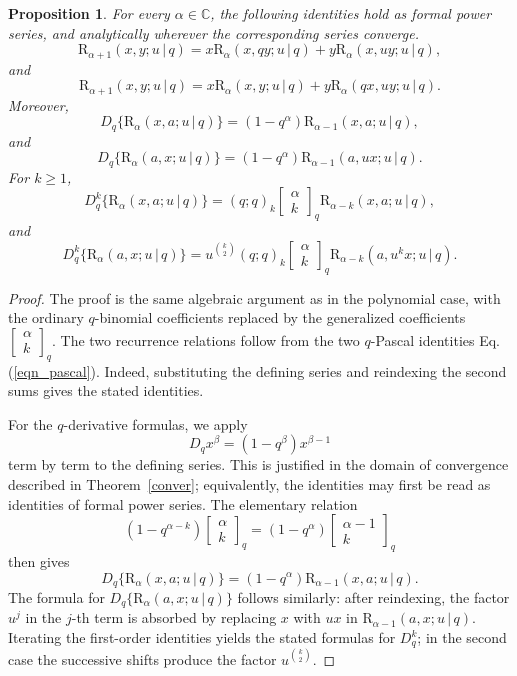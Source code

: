 \documentclass[12pt]{article}
\newcommand{\rr}{\mathrm{R}}
\newtheorem{proposition}{Proposition}
\begin{document}
\begin{proposition}
For every \(\alpha\in\mathbb C\), the following identities hold as formal power series, and analytically wherever the corresponding series
converge.
\[
\rr_{\alpha+1}(x,y;u\,|\,q)
=
x\rr_{\alpha}(x,qy;u\,|\,q)
+
y\rr_{\alpha}(x,uy;u\,|\,q),
\]
and
\[
\rr_{\alpha+1}(x,y;u\,|\,q)
=
x\rr_{\alpha}(x,y;u\,|\,q)
+
y\rr_{\alpha}(qx,uy;u\,|\,q).
\]
Moreover,
\[
D_q\{\rr_{\alpha}(x,a;u\,|\,q)\}
=
(1-q^\alpha)\rr_{\alpha-1}(x,a;u\,|\,q),
\]
and
\[
D_q\{\rr_{\alpha}(a,x;u\,|\,q)\}
=
(1-q^\alpha)\rr_{\alpha-1}(a,ux;u\,|\,q).
\]
For \(k\geq 1\),
\begin{equation}\label{derkx_rr}
D_q^k\{\rr_{\alpha}(x,a;u\,|\,q)\}
=
(q;q)_k
\begin{bmatrix}
\alpha\\ k
\end{bmatrix}_q
\rr_{\alpha-k}(x,a;u\,|\,q),
\end{equation}
and
\[
D_q^k\{\rr_{\alpha}(a,x;u\,|\,q)\}
=
u^{\binom{k}{2}}
(q;q)_k
\begin{bmatrix}
\alpha\\ k
\end{bmatrix}_q
\rr_{\alpha-k}(a,u^kx;u\,|\,q).
\]
\end{proposition}
\begin{proof}
The proof is the same algebraic argument as in the polynomial case,
with the ordinary \(q\)-binomial coefficients replaced by the generalized
coefficients \(\begin{bmatrix}\alpha\\ k\end{bmatrix}_q\). The two recurrence
relations follow from the two \(q\)-Pascal identities Eq.(\ref{eqn_pascal}). Indeed, substituting the defining series and reindexing the second sums gives the stated identities.

For the \(q\)-derivative formulas, we apply
\[
D_q x^\beta=(1-q^\beta)x^{\beta-1}
\]
term by term to the defining series. This is justified in the domain of
convergence described in Theorem~\ref{conver}; equivalently,
the identities may first be read as identities of formal power series.
The elementary relation
\[
(1-q^{\alpha-k})
\begin{bmatrix}
\alpha\\ k
\end{bmatrix}_q
=
(1-q^\alpha)
\begin{bmatrix}
\alpha-1\\ k
\end{bmatrix}_q
\]
then gives
\[
D_q\{\rr_\alpha(x,a;u\,|\,q)\}
=
(1-q^\alpha)\rr_{\alpha-1}(x,a;u\,|\,q).
\]
The formula for \(D_q\{\rr_{\alpha}(a,x;u\,|\,q)\}\) follows similarly:
after reindexing, the factor \(u^j\) in the \(j\)-th term is absorbed
by replacing \(x\) with \(ux\) in \(\rr_{\alpha-1}(a,x;u\,|\,q)\).
Iterating the first-order identities yields the stated formulas for
\(D_q^k\); in the second case the successive shifts produce the factor
\(u^{\binom{k}{2}}\).
\end{proof}
\end{document}
